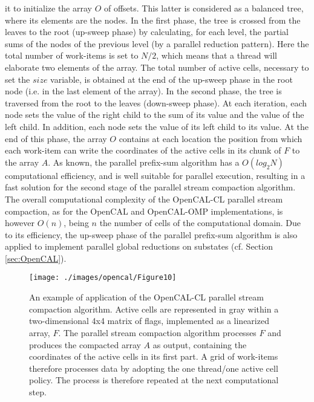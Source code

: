 it to initialize the array $O$ of offsets. This latter is considered
as a balanced tree, where its elements are the nodes. In the first
phase, the tree is crossed from the leaves to the root (up-sweep
phase) by calculating, for each level, the partial sums of the nodes
of the previous level (by a parallel reduction pattern). Here the
total number of work-items is set to $N/2$, which means that a
thread will elaborate two elements of the array. The total number of
active cells, necessary to set the $size$ variable, is obtained at
the end of the up-sweep phase in the root node (i.e. in the last
element of the array). In the second phase, the tree is traversed
from the root to the leaves (down-sweep phase). At each iteration,
each node sets the value of the right child to the sum of its value
and the value of the left child. In addition, each node sets the
value of its left child to its value. At the end of this phase, the
array $O$ contains at each location the position from which each
work-item can write the coordinates of the active cells in its chunk
of $F$ to the array $A$. As known, the parallel prefix-sum algorithm
has a $O(log_2 N)$ computational efficiency, and is well suitable
for parallel execution, resulting in a fast solution for the second
stage of the parallel stream compaction algorithm. The overall
computational complexity of the OpenCAL-CL parallel stream
compaction, as for the OpenCAL and OpenCAL-OMP implementations, is
however $O(n)$, being $n$ the number of cells of the computational
domain. Due to its efficiency, the up-sweep phase of the parallel
prefix-sum algorithm is also applied to implement parallel global
reductions on substates (cf. Section \ref{sec:OpenCAL}).
\begin{figure}
	\begin{center}
		\texttt{[image: ./images/opencal/Figure10]}
		\caption{An example of application of the OpenCAL-CL parallel stream compaction algorithm. Active cells are represented in gray within a
			two-dimensional 4x4 matrix of flags, implemented as a linearized
			array, $F$. The parallel stream compaction algorithm processes $F$ and produces the compacted array $A$ as output, containing the coordinates of the active cells in its first part. A grid of work-items therefore processes data by adopting the one thread/one active cell policy. The process is therefore repeated at the next computational step.}
		\label{fig:streamcompaction}
	\end{center}
\end{figure}


